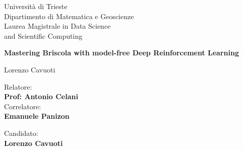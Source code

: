 \begin{titlepage}
    \begin{figure}
        \centering
        
    \end{figure}

    \begin{center}
        \LARGE{Università di Trieste\\}
        \vspace{5mm}
        \LARGE{Dipartimento di Matematica e Geoscienze\\}
        \vspace{5mm}
        \LARGE{Laurea Magistrale in Data Science \\ and Scientific Computing\\}
        
        \vspace{10mm}
         \huge{\bf Mastering Briscola with model-free Deep Reinforcement Learning}
        
        \vspace{10mm}
        \LARGE{Lorenzo Cavuoti}
    \end{center}

    \vspace{5mm}

    \begin{minipage}{0.47\textwidth}
        {\large{Relatore:}
        {\normalsize\vspace{3mm} \bf\\ \large{Prof: Antonio Celani}}}
        {\vspace{3mm} \large{\\Correlatore:}
        {\normalsize\vspace{3mm} \bf\\ \large{Emanuele Panizon}}}
    \end{minipage}
    \hfill
    \begin{minipage}{0.47\textwidth}\raggedleft
        {\large{Candidato:}{\normalsize\vspace{3mm} \bf\\ \large{Lorenzo Cavuoti}}}
    \end{minipage}

    \vspace{15mm}
\end{titlepage}